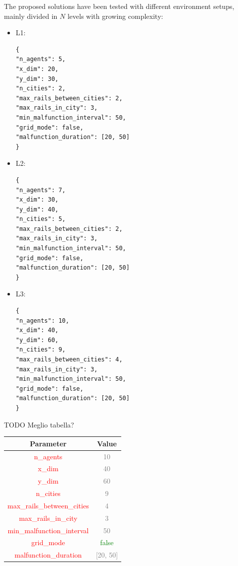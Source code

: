 \documentclass[12pt]{article}
\begin{document}
The proposed solutions have been tested with different environment setups, mainly divided in $N$ levels with growing complexity:

\begin{itemize}
    \item L1: 
        \begin{verbatim}
{
"n_agents": 5,
"x_dim": 20,
"y_dim": 30,
"n_cities": 2,
"max_rails_between_cities": 2,
"max_rails_in_city": 3,
"min_malfunction_interval": 50,
"grid_mode": false,
"malfunction_duration": [20, 50]
}
        \end{verbatim}
    \item L2: 
        \begin{verbatim}
{
"n_agents": 7,
"x_dim": 30,
"y_dim": 40,
"n_cities": 5,
"max_rails_between_cities": 2,
"max_rails_in_city": 3,
"min_malfunction_interval": 50,
"grid_mode": false,
"malfunction_duration": [20, 50]
}
        \end{verbatim}
    \item L3: 
        \begin{verbatim}
{
"n_agents": 10,
"x_dim": 40,
"y_dim": 60,
"n_cities": 9,
"max_rails_between_cities": 4,
"max_rails_in_city": 3,
"min_malfunction_interval": 50,
"grid_mode": false,
"malfunction_duration": [20, 50]
}
        \end{verbatim}
\end{itemize}

TODO Meglio tabella?

\begin{center}
\begin{tabular}{ |c|c| } 
        \hline
    \textbf{Parameter} & \textbf{Value} \\ 
        \hline
    \textcolor{red}{n\_agents} & \textcolor{gray}{10} \\ 
        \hline
    \textcolor{red}{x\_dim} & \textcolor{gray}{40}\\ 
        \hline
    \textcolor{red}{y\_dim} & \textcolor{gray}{60}\\ 
        \hline
    \textcolor{red}{n\_cities} & \textcolor{gray}{9}\\ 
        \hline
    \textcolor{red}{ max\_rails\_between\_cities} & \textcolor{gray}{4}\\ 
        \hline
    \textcolor{red}{max\_rails\_in\_city} & \textcolor{gray}{3}\\ 
        \hline
    \textcolor{red}{min\_malfunction\_interval} & \textcolor{gray}{50}\\ 
        \hline
    \textcolor{red}{grid\_mode} & \textcolor{green}{false}\\ 
        \hline
    \textcolor{red}{malfunction\_duration} & \textcolor{gray}{[20, 50]}\\ 
 \hline
\end{tabular}
\end{center}
\end{document}
